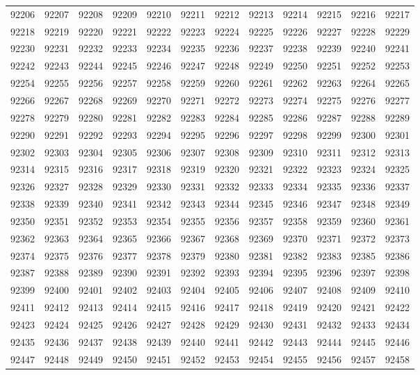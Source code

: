 \begin{center}
\begin{longtable}{llllllllllll}
92206 &92207 &92208 &92209 &92210 &92211 &92212 &92213 &92214 &92215 &92216 &92217 \\
92218 &92219 &92220 &92221 &92222 &92223 &92224 &92225 &92226 &92227 &92228 &92229 \\
92230 &92231 &92232 &92233 &92234 &92235 &92236 &92237 &92238 &92239 &92240 &92241 \\
92242 &92243 &92244 &92245 &92246 &92247 &92248 &92249 &92250 &92251 &92252 &92253 \\
92254 &92255 &92256 &92257 &92258 &92259 &92260 &92261 &92262 &92263 &92264 &92265 \\
92266 &92267 &92268 &92269 &92270 &92271 &92272 &92273 &92274 &92275 &92276 &92277 \\
92278 &92279 &92280 &92281 &92282 &92283 &92284 &92285 &92286 &92287 &92288 &92289 \\
92290 &92291 &92292 &92293 &92294 &92295 &92296 &92297 &92298 &92299 &92300 &92301 \\
92302 &92303 &92304 &92305 &92306 &92307 &92308 &92309 &92310 &92311 &92312 &92313 \\
92314 &92315 &92316 &92317 &92318 &92319 &92320 &92321 &92322 &92323 &92324 &92325 \\
92326 &92327 &92328 &92329 &92330 &92331 &92332 &92333 &92334 &92335 &92336 &92337 \\
92338 &92339 &92340 &92341 &92342 &92343 &92344 &92345 &92346 &92347 &92348 &92349 \\
92350 &92351 &92352 &92353 &92354 &92355 &92356 &92357 &92358 &92359 &92360 &92361 \\
92362 &92363 &92364 &92365 &92366 &92367 &92368 &92369 &92370 &92371 &92372 &92373 \\
92374 &92375 &92376 &92377 &92378 &92379 &92380 &92381 &92382 &92383 &92385 &92386 \\
92387 &92388 &92389 &92390 &92391 &92392 &92393 &92394 &92395 &92396 &92397 &92398 \\
92399 &92400 &92401 &92402 &92403 &92404 &92405 &92406 &92407 &92408 &92409 &92410 \\
92411 &92412 &92413 &92414 &92415 &92416 &92417 &92418 &92419 &92420 &92421 &92422 \\
92423 &92424 &92425 &92426 &92427 &92428 &92429 &92430 &92431 &92432 &92433 &92434 \\
92435 &92436 &92437 &92438 &92439 &92440 &92441 &92442 &92443 &92444 &92445 &92446 \\
92447 &92448 &92449 &92450 &92451 &92452 &92453 &92454 &92455 &92456 &92457 &92458 \\

\end{longtable}
\end{center}
